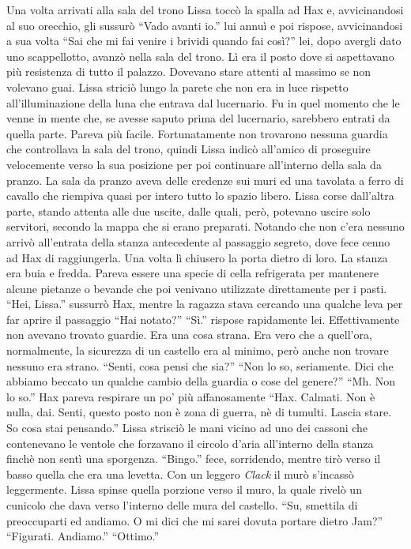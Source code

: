     Una volta arrivati alla sala del trono Lissa toccò la spalla ad Hax e,
    avvicinandosi al suo orecchio, gli sussurò ``Vado avanti io.'' lui
    annuì e poi rispose, avvicinandosi a sua volta ``Sai che mi fai venire
    i brividi quando fai così?'' lei, dopo avergli dato uno scappellotto,
    avanzò nella sala del trono. Lì era il posto dove si aspettavano più
    resistenza di tutto il palazzo. Dovevano stare attenti al massimo se
    non volevano guai. Lissa striciò lungo la parete che non era in luce
    rispetto all'illuminazione della luna che entrava dal lucernario. Fu in
    quel momento che le venne in mente che, se avesse saputo prima del
    lucernario, sarebbero entrati da quella parte. Pareva più facile.
    Fortunatamente non trovarono nessuna guardia che controllava la sala
    del trono, quindi Lissa indicò all'amico di proseguire velocemente
    verso la sua posizione per poi continuare all'interno della sala da
    pranzo. La sala da pranzo aveva delle credenze sui muri ed una tavolata
    a ferro di cavallo che riempiva quasi per intero tutto lo spazio
    libero. Lissa corse dall'altra parte, stando attenta alle due uscite,
    dalle quali, però, potevano uscire solo servitori, secondo la mappa che
    si erano preparati. Notando che non c'era nessuno arrivò all'entrata
    della stanza antecedente al passaggio segreto, dove fece cenno ad Hax
    di raggiungerla. Una volta lì chiusero la porta dietro di loro. La
    stanza era buia e fredda. Pareva essere una specie di cella refrigerata
    per mantenere alcune pietanze o bevande che poi venivano utilizzate
    direttamente per i pasti. ``Hei, Lissa.'' sussurrò Hax, mentre la
    ragazza stava cercando una qualche leva per far aprire il passaggio
    ``Hai notato?'' ``Sì.'' rispose rapidamente lei. Effettivamente non
    avevano trovato guardie. Era una cosa strana. Era vero che a quell'ora,
    normalmente, la sicurezza di un castello era al minimo, però anche non
    trovare nessuno era strano. ``Senti, cosa pensi che sia?'' ``Non lo so,
    seriamente. Dici che abbiamo beccato un qualche cambio della guardia o
    cose del genere?'' ``Mh. Non lo so.'' Hax pareva respirare un po' più
    affanosamente ``Hax. Calmati. Non è nulla, dai. Senti, questo posto non
    è zona di guerra, nè di tumulti. Lascia stare. So cosa stai pensando.''
    Lissa strisciò le mani vicino ad uno dei cassoni che contenevano le
    ventole che forzavano il circolo d'aria all'interno della stanza finchè
    non sentì una sporgenza. ``Bingo.'' fece, sorridendo, mentre tirò verso
    il basso quella che era una levetta. Con un leggero \emph{Clack} il
    murò s'incassò leggermente. Lissa spinse quella porzione verso il muro,
    la quale rivelò un cunicolo che dava verso l'interno delle mura del
    castello. ``Su, smettila di preoccuparti ed andiamo. O mi dici che mi
    sarei dovuta portare dietro Jam?'' ``Figurati. Andiamo.'' ``Ottimo.''

